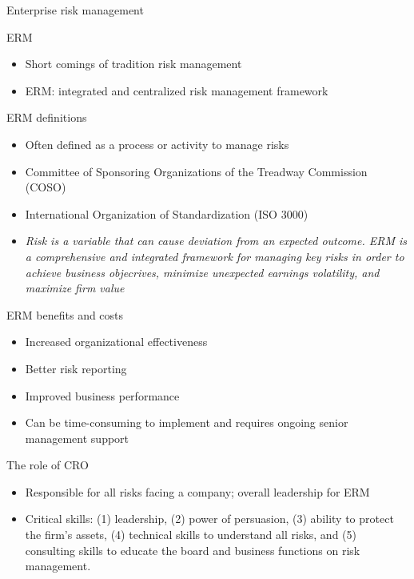\begin{frame}[allowframebreaks]{Enterprise risk management}

\begin{block}{ERM}
	\begin{itemize}
		\item Short comings of tradition risk management
		\item ERM: integrated and centralized risk management framework
	\end{itemize}
\end{block}

\begin{block}{ERM definitions}
	\begin{itemize}
		\item Often defined as a process or activity to manage risks
		\item Committee of Sponsoring Organizations of the Treadway Commission (COSO)
		\item International Organization of Standardization (ISO 3000)
		\item \textit{Risk is a variable that can cause deviation from an expected outcome. ERM is a
		comprehensive and integrated framework for managing key risks in order to achieve business
		objecrives, minimize unexpected earnings volatility, and maximize firm value}
	\end{itemize}
\end{block}

\begin{block}{ERM benefits and costs}
	\begin{itemize}
		\item Increased organizational effectiveness
		\item Better risk reporting
		\item Improved business performance
		\item Can be time-consuming to implement and requires ongoing senior management support
	\end{itemize}
\end{block}

\begin{block}{The role of CRO}
	\begin{itemize}
		\item Responsible for all risks facing a company; overall leadership for ERM
		\item Critical skills: (1) leadership, (2) power of persuasion, (3) ability
		to protect the firm's assets, (4) technical skills to understand all risks, and (5) consulting
		skills to educate the board and business functions on risk management.
	\end{itemize}
\end{block}


\end{frame}
